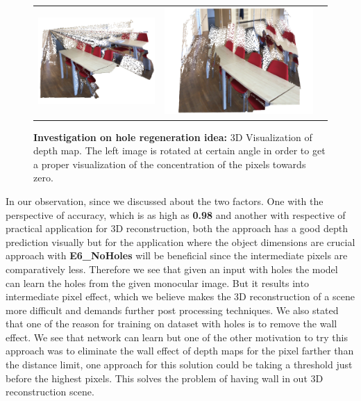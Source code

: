  \begin{figure}[!]
%
\centering\begin{tabular}{c@{ }c@{ }c@{ }}
\includegraphics[width=.5\linewidth]{Figures/results/3D/holes001.png}&
\includegraphics[width=.5\linewidth]{Figures/results/3D/noholes002.png}\\[-1ex]
\end{tabular}
\caption{\textbf{Investigation on hole regeneration idea:} 3D Visualization of depth map. The left image is rotated at certain angle in order to get a proper visualization of the concentration of the pixels towards zero.}
\label{fig:3drecon}
\end{figure}

In our observation, since we discussed about the two factors. One with the perspective of accuracy, which is as high as \textbf{0.98} and another with respective of practical application for 3D reconstruction, both the approach has a good depth prediction visually but for the application where the object dimensions are crucial approach with \textbf{E6\_NoHoles} will be beneficial since the intermediate pixels are comparatively less. 
Therefore we see that given an input with holes the model can learn the holes from the given monocular image. But it results into intermediate pixel effect, which we believe makes the 3D reconstruction of a scene more difficult and demands further post processing techniques. We also stated that one of the reason for training on dataset with holes is to remove the wall effect. We see that network can learn but one of the other motivation to try this approach was to eliminate the wall effect of depth maps for the pixel farther than the distance limit, one approach for this solution could be taking a threshold just before the highest pixels. This solves the problem of having wall in out 3D reconstruction scene.\\


